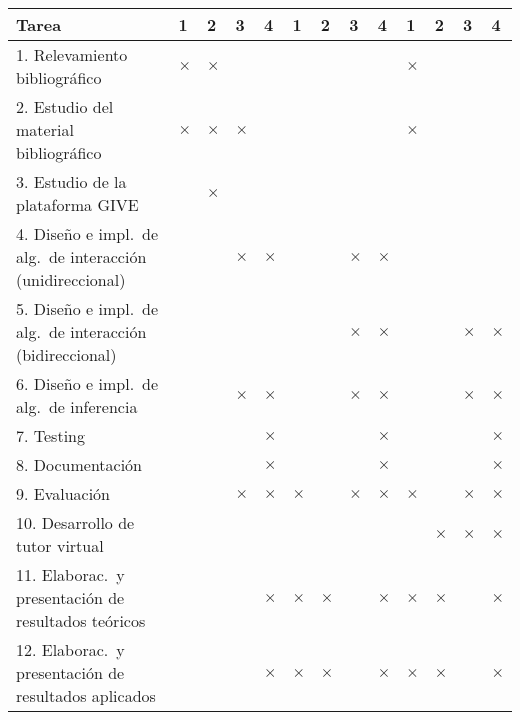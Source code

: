 {\footnotesize
\begin{center}
\begin{tabular}{|p{7cm}||p{2mm}|p{2mm}|p{2mm}|p{2mm}||p{2mm}|p{2mm}|p{2mm}|p{2mm}||p{2mm}|p{2mm}|p{2mm}|p{2mm}||}
\hline
 \rowcolor[rgb]{0.8,0.8,0.8}\hspace{3.5cm}Tarea & 1 & 2 & 3 & 4 & 1 & 2 & 3 & 4 & 1 & 2 & 3 & 4\\
\hline 1. Relevamiento bibliogr\'afico
& $\times$ & $\times$ &&&&&&&$\times$&&&\\
\hline 2. Estudio del material bibliogr\'afico
& $\times$ & $\times$ & $\times$ &  &&&&&$\times$&&&\\
\hline 3. Estudio de la plataforma GIVE
& & $\times$ & &&&&&&&&&\\
\hline 4. Dise\~no e impl.\ de alg.\ de interacci\'on (unidireccional)
& & & $\times$ & $\times$&&&$\times$&$\times$&&&&\\
\hline 5. Dise\~no e impl.\ de alg.\ de interacci\'on (bidireccional)
& & &  & &&&$\times$&$\times$&&&$\times$&$\times$\\
\hline 6. Dise\~no e impl.\ de alg.\ de inferencia
& & & $\times$ & $\times$&&&$\times$&$\times$&&&$\times$&$\times$\\
\hline 7. Testing
&&&&$\times$&&&&$\times$&&&&$\times$\\
\hline 8. Documentaci\'on
&&&&$\times$&&&&$\times$&&&&$\times$\\
\hline 9. Evaluaci\'on
&&&$\times$&$\times$&$\times$&&$\times$&$\times$&$\times$&&$\times$&$\times$\\
\hline 10. Desarrollo de tutor virtual
&&&&&&&&&&$\times$&$\times$&$\times$\\
\hline 11. Elaborac.\ y presentaci\'on de resultados te\'oricos
&&&&$\times$&$\times$&$\times$&&$\times$&$\times$&$\times$&&$\times$\\
\hline 12. Elaborac.\ y presentaci\'on de resultados aplicados
&&&&$\times$&$\times$&$\times$&&$\times$&$\times$&$\times$&&$\times$\\\hline
\end{tabular}\end{center}
}



